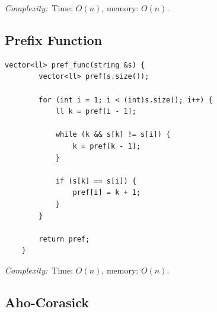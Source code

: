 \documentclass[10pt,a4paper]{article}
\newcommand{\complexity}[1]{\textit{Complexity:}~#1}
\begin{document}
\complexity{Time: $O(n)$, memory: $O(n)$.}

\subsection*{Prefix Function}

\begin{lstlisting}[style=cpp]
	vector<ll> pref_func(string &s) {
		vector<ll> pref(s.size());
		
		for (int i = 1; i < (int)s.size(); i++) {
			ll k = pref[i - 1];
			
			while (k && s[k] != s[i]) {
				k = pref[k - 1];
			}
			
			if (s[k] == s[i]) {
				pref[i] = k + 1;
			}
		}
		
		return pref;
	}
\end{lstlisting}

\complexity{Time: $O(n)$, memory: $O(n)$.}

\subsection*{Aho-Corasick}
\end{document}
